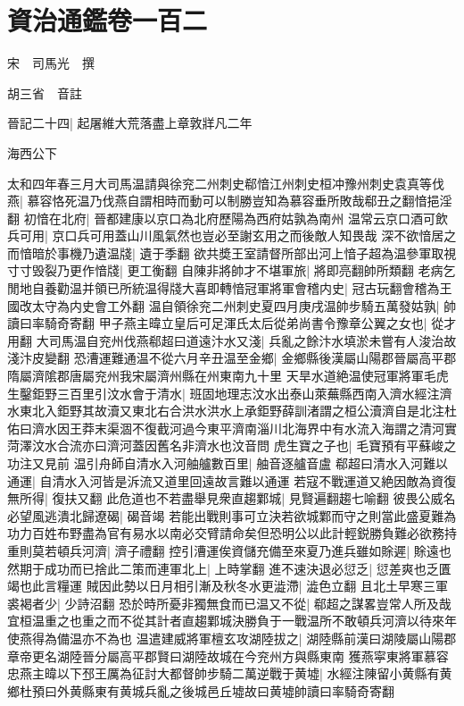 \chapter{資治通鑑卷一百二}
宋　司馬光　撰

胡三省　音註

晉記二十四|{
	起屠維大荒落盡上章敦牂凡二年}


海西公下

太和四年春三月大司馬温請與徐兖二州刺史郗愔江州刺史桓冲豫州刺史袁真等伐燕|{
	慕容恪死温乃伐燕自謂相時而動可以制勝豈知為慕容垂所敗哉郗丑之翻愔挹淫翻}
初愔在北府|{
	晉都建康以京口為北府歷陽為西府姑孰為南州}
温常云京口酒可飲兵可用|{
	京口兵可用蓋山川風氣然也豈必至謝玄用之而後敵人知畏哉}
深不欲愔居之而愔暗於事機乃遺温牋|{
	遺于季翻}
欲共奬王室請督所部出河上愔子超為温參軍取視寸寸毁裂乃更作愔牋|{
	更工衡翻}
自陳非將帥才不堪軍旅|{
	將即亮翻帥所類翻}
老病乞閒地自養勸温并領已所統温得牋大喜即轉愔冠軍將軍會稽内史|{
	冠古玩翻會稽為王國改太守為内史會工外翻}
温自領徐兖二州刺史夏四月庚戌温帥步騎五萬發姑孰|{
	帥讀曰率騎奇寄翻}
甲子燕主暐立皇后可足渾氏太后從弟尚書令豫章公翼之女也|{
	從才用翻}
大司馬温自兖州伐燕郗超曰道遠汴水又淺|{
	兵亂之餘汴水填淤未嘗有人浚治故淺汴皮變翻}
恐漕運難通温不從六月辛丑温至金鄉|{
	金鄉縣後漢屬山陽郡晉屬高平郡隋屬濟隂郡唐屬兖州我宋屬濟州縣在州東南九十里}
天旱水道絶温使冠軍將軍毛虎生鑿鉅野三百里引汶水會于清水|{
	班固地理志汶水出泰山萊蕪縣西南入濟水經注濟水東北入鉅野其故瀆又東北右合洪水洪水上承鉅野薛訓渚謂之桓公瀆濟自是北注杜佑曰濟水因王莽末渠涸不復截河過今東平濟南淄川北海界中有水流入海謂之清河實菏澤汶水合流亦曰濟河蓋因舊名非濟水也汶音問}
虎生寶之子也|{
	毛寶預有平蘇峻之功注又見前}
温引舟師自清水入河舳艫數百里|{
	舳音逐艫音盧}
郗超曰清水入河難以通運|{
	自清水入河皆是泝流又道里回遠故言難以通運}
若寇不戰運道又絶因敵為資復無所得|{
	復扶又翻}
此危道也不若盡舉見衆直趨鄴城|{
	見賢遍翻趨七喻翻}
彼畏公威名必望風逃潰北歸遼碣|{
	碣音竭}
若能出戰則事可立決若欲城鄴而守之則當此盛夏難為功力百姓布野盡為官有易水以南必交臂請命矣但恐明公以此計輕鋭勝負難必欲務持重則莫若頓兵河濟|{
	濟子禮翻}
控引漕運俟資儲充備至來夏乃進兵雖如賖遲|{
	賖遠也}
然期于成功而已捨此二策而連軍北上|{
	上時掌翻}
進不速決退必愆乏|{
	愆差爽也乏匱竭也此言糧運}
賊因此勢以日月相引漸及秋冬水更澁滯|{
	澁色立翻}
且北土早寒三軍裘褐者少|{
	少詩沼翻}
恐於時所憂非獨無食而已温又不從|{
	郗超之謀畧豈常人所及哉宜桓温重之也重之而不從其計者直趨鄴城決勝負于一戰温所不敢頓兵河濟以待來年使燕得為備温亦不為也}
温遣建威將軍檀玄攻湖陸拔之|{
	湖陸縣前漢曰湖陵屬山陽郡章帝更名湖陸晉分屬高平郡賢曰湖陸故城在今兖州方與縣東南}
獲燕寜東將軍慕容忠燕主暐以下邳王厲為征討大都督帥步騎二萬逆戰于黄墟|{
	水經注陳留小黄縣有黄鄉杜預曰外黄縣東有黄城兵亂之後城邑丘墟故曰黄墟帥讀曰率騎奇寄翻}
